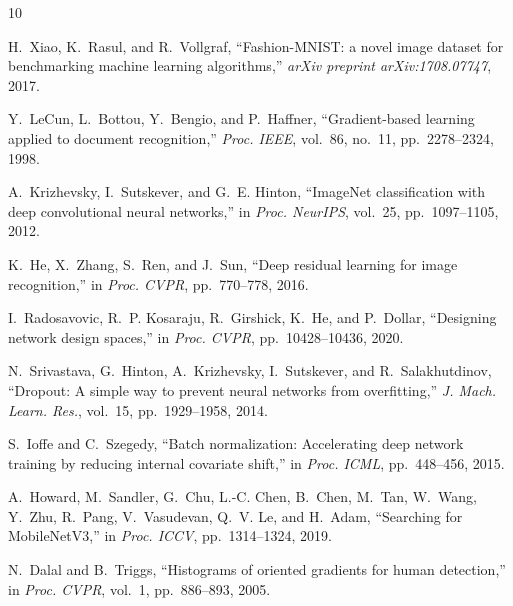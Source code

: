 \documentclass[conference]{IEEEtran}
\begin{document}
\begin{thebibliography}{10}

H.~Xiao, K.~Rasul, and R.~Vollgraf,
``Fashion-{MNIST}: a novel image dataset for benchmarking machine learning algorithms,''
\textit{arXiv preprint arXiv:1708.07747}, 2017.

Y.~LeCun, L.~Bottou, Y.~Bengio, and P.~Haffner,
``Gradient-based learning applied to document recognition,''
\textit{Proc. IEEE}, vol.~86, no.~11, pp.~2278--2324, 1998.

A.~Krizhevsky, I.~Sutskever, and G.~E. Hinton,
``ImageNet classification with deep convolutional neural networks,''
in \textit{Proc. NeurIPS}, vol.~25, pp.~1097--1105, 2012.

K.~He, X.~Zhang, S.~Ren, and J.~Sun,
``Deep residual learning for image recognition,''
in \textit{Proc. CVPR}, pp.~770--778, 2016.

I.~Radosavovic, R.~P. Kosaraju, R.~Girshick, K.~He, and P.~Dollar,
``Designing network design spaces,''
in \textit{Proc. CVPR}, pp.~10428--10436, 2020.

N.~Srivastava, G.~Hinton, A.~Krizhevsky, I.~Sutskever, and R.~Salakhutdinov,
``Dropout: A simple way to prevent neural networks from overfitting,''
\textit{J. Mach. Learn. Res.}, vol.~15, pp.~1929--1958, 2014.

S.~Ioffe and C.~Szegedy,
``Batch normalization: Accelerating deep network training by reducing internal covariate shift,''
in \textit{Proc. ICML}, pp.~448--456, 2015.

A.~Howard, M.~Sandler, G.~Chu, L.-C. Chen, B.~Chen, M.~Tan, W.~Wang, Y.~Zhu,
R.~Pang, V.~Vasudevan, Q.~V. Le, and H.~Adam,
``Searching for {MobileNetV3},''
in \textit{Proc. ICCV}, pp.~1314--1324, 2019.

N.~Dalal and B.~Triggs,
``Histograms of oriented gradients for human detection,''
in \textit{Proc. CVPR}, vol.~1, pp.~886--893, 2005.

\end{thebibliography}
\end{document}
